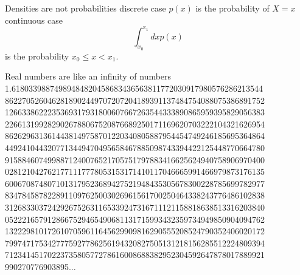 \documentclass{beamer}
\newcommand{\crish}{\color{reddish}}
\newcommand{\cred}{\color{red}}
\newcommand{\cblu}{\color{blue}}
\begin{document}
\begin{frame}{Densities are not probabilities}
  \cred
  discrete case $p(x)$ is the probability of $X=x$\\
  \cblu
  continuous case
  $$\int_{x_0}^{x_1}dx p(x)$$ is the probability $x_0\le x< x_1$.
\end{frame}

\begin{frame}{Real numbers are like an infinity of numbers}
  \crish
  1.61803398874989484820458683436563811772030917980576286213544
  8622705260462818902449707207204189391137484754088075386891752
  1266338622235369317931800607667263544333890865959395829056383
  2266131992829026788067520876689250171169620703222104321626954
  8626296313614438149758701220340805887954454749246185695364864
  4492410443207713449470495658467885098743394422125448770664780
  9158846074998871240076521705751797883416625624940758906970400
  0281210427621771117778053153171410117046665991466979873176135
  6006708748071013179523689427521948435305678300228785699782977
  8347845878228911097625003026961561700250464338243776486102838
  3126833037242926752631165339247316711121158818638513316203840
  0522216579128667529465490681131715993432359734949850904094762
  1322298101726107059611645629909816290555208524790352406020172
  7997471753427775927786256194320827505131218156285512224809394
  7123414517022373580577278616008688382952304592647878017889921
  990270776903895$\ldots$
  \end{frame}
\end{document}
